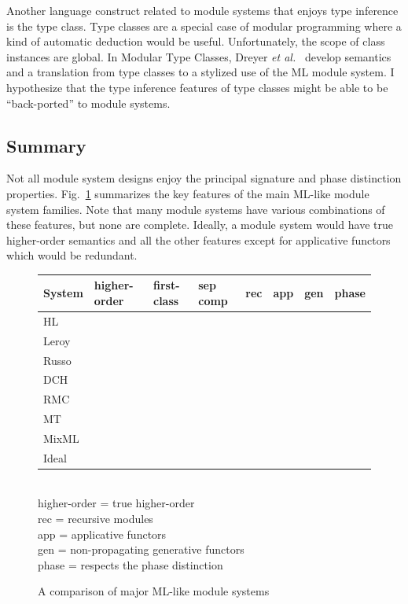 \documentclass[12pt]{article}
\newcommand{\chk}{\ding{51}}
\newcommand{\ex}{\ding{55}}
\newcommand{\etal}{{\it et al.}}
\begin{document}
	Another language construct related to module systems that enjoys type inference is the type class. Type classes are a special case of modular programming where a kind of automatic deduction would be useful. Unfortunately, the scope of class instances are global. In Modular Type Classes, Dreyer \etal~ \cite{dhck07} develop semantics and a translation from type classes to a stylized use of the ML module system. I hypothesize that the type inference features of type classes might be able to be ``back-ported'' to module systems. 

\subsection{Summary}
Not all module system designs enjoy the principal signature and phase distinction properties.  Fig.~\ref{fig:sys-features} summarizes the key features of the main ML-like module system families. Note that many module systems have various combinations of these features, but none are complete. Ideally, a module system would have true higher-order semantics and all the other features except for applicative functors which would be redundant. 

\begin{figure}
	\small
\begin{tabular}{|l|l|l|l|l|l|l|l|}
	\hline
System & higher-order & first-class & sep comp & rec & app & gen & phase\\
	\hline
	HL \cite{lillibridge94} & \ex & \chk & \chk & \ex & \ex & \ex & \chk \\
	\hline
	Leroy \cite{leroy95} & \ex & \ex & \chk & \ex & \chk & \ex & \chk \\
	\hline
	Russo \cite{russo01} & \ex & \chk & \chk & \chk & \chk & \chk & \chk \\
	\hline
	DCH \cite{dhc03} & \ex & \chk & \ex & \ex & \chk & \chk & \chk \\
	\hline
	RMC \cite{dreyer07} & \ex & \ex & \ex & \chk & \ex & \chk & \chk\\
	\hline
	MT \cite{mt94} & \chk & \ex & \ex & \ex & \ex & \chk & \chk \\
	\hline
	MixML \cite{mixml} & \ex & \chk & \chk & \chk & \ex & \chk & \ex \\
	\hline
	Ideal & \chk & \chk & \chk & \chk & \ex & \chk & \chk \\
	\hline
\end{tabular}\\
higher-order = true higher-order\\
rec = recursive modules\\
app = applicative functors\\
gen = non-propagating generative functors\\
phase = respects the phase distinction
\caption{A comparison of major ML-like module systems}
\label{fig:sys-features}
\end{figure}												
				
\end{document}
